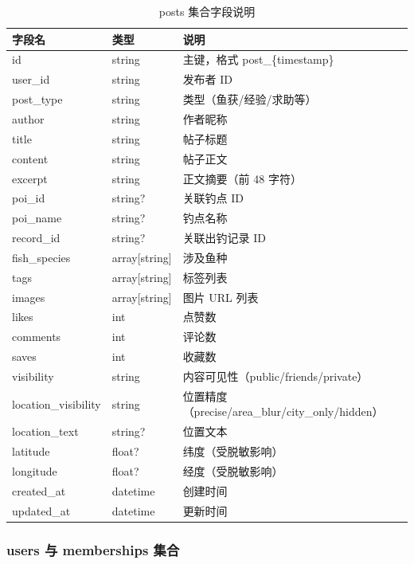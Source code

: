 \documentclass[12pt,a4paper]{ctexart}
\begin{document}
\begin{table}[H]
  \centering
  \caption{posts 集合字段说明}
  \label{tab:posts-schema}
  \begin{tabular}{p{3.5cm}p{2cm}p{6.5cm}}
    \toprule
    \textbf{字段名} & \textbf{类型} & \textbf{说明} \\
    \midrule
    id & string & 主键，格式 post\_\{timestamp\} \\
    user\_id & string & 发布者 ID \\
    post\_type & string & 类型（鱼获/经验/求助等） \\
    author & string & 作者昵称 \\
    title & string & 帖子标题 \\
    content & string & 帖子正文 \\
    excerpt & string & 正文摘要（前 48 字符） \\
    poi\_id & string? & 关联钓点 ID \\
    poi\_name & string? & 钓点名称 \\
    record\_id & string? & 关联出钓记录 ID \\
    fish\_species & array[string] & 涉及鱼种 \\
    tags & array[string] & 标签列表 \\
    images & array[string] & 图片 URL 列表 \\
    likes & int & 点赞数 \\
    comments & int & 评论数 \\
    saves & int & 收藏数 \\
    visibility & string & 内容可见性（public/friends/private） \\
    location\_visibility & string & 位置精度（precise/area\_blur/city\_only/hidden） \\
    location\_text & string? & 位置文本 \\
    latitude & float? & 纬度（受脱敏影响） \\
    longitude & float? & 经度（受脱敏影响） \\
    created\_at & datetime & 创建时间 \\
    updated\_at & datetime & 更新时间 \\
    \bottomrule
  \end{tabular}
\end{table}

\subsubsection{users 与 memberships 集合}
\end{document}
